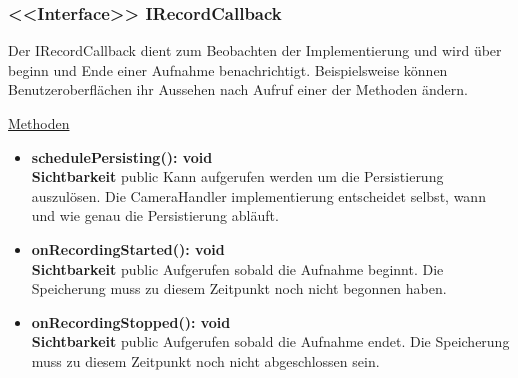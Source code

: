 \subsubsection{<<Interface>> IRecordCallback} \label{app:klasse:IRecordCallback}
Der IRecordCallback dient zum Beobachten der  Implementierung und wird über beginn und Ende einer Aufnahme benachrichtigt. Beispielsweise können Benutzeroberflächen ihr Aussehen nach Aufruf einer der Methoden ändern.
\newline

\underline{Methoden}
\begin{itemize}
\itemsep0pt

\item \textbf{schedulePersisting(): void}\hfill\\
\textbf{Sichtbarkeit} public\newline
Kann aufgerufen werden um die Persistierung auszulösen. Die CameraHandler implementierung entscheidet selbst, wann und wie genau die Persistierung abläuft.

\item \textbf{onRecordingStarted(): void}\hfill\\
\textbf{Sichtbarkeit} public\newline
Aufgerufen sobald die Aufnahme beginnt. Die Speicherung muss zu diesem Zeitpunkt noch nicht begonnen haben.

\item \textbf{onRecordingStopped(): void}\hfill\\
\textbf{Sichtbarkeit} public\newline
Aufgerufen sobald die Aufnahme endet. Die Speicherung muss zu diesem Zeitpunkt noch nicht abgeschlossen sein.

\end{itemize}